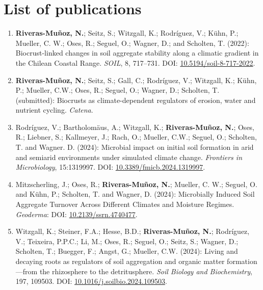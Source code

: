 \chapter*{List of publications}

\begin{enumerate}

\item \textbf{Riveras-Muñoz, N.}; Seitz, S.; Witzgall, K.; Rodríguez, V.; Kühn, P.; Mueller, C. W.; Oses, R.; Seguel, O.; Wagner, D.; and Scholten, T. (2022): Biocrust-linked changes in soil aggregate stability along a climatic gradient in the Chilean Coastal Range. \textit{SOIL}, 8, 717--731. DOI: \href{https://doi.org/10.5194/soil-8-717-2022}{10.5194/soil-8-717-2022}.

\item \textbf{Riveras-Muñoz, N.}; Seitz, S.; Gall, C.; Rodríguez, V.; Witzgall, K.; Kühn, P.; Mueller, C.W.; Oses, R.; Seguel, O.; Wagner, D.; Scholten, T. (submitted): Biocrusts as climate-dependent regulators of erosion, water and nutrient cycling. \textit{Catena}.

\item Rodríguez, V.; Bartholomäus, A.; Witzgall, K.; \textbf{Riveras-Muñoz, N.}; Oses, R.; Liebner, S.; Kallmeyer, J.; Rach, O.; Mueller, C.W.; Seguel, O.; Scholten, T. and Wagner. D. (2024): Microbial impact on initial soil formation in arid and semiarid environments under simulated climate change. \textit{Frontiers in Microbiology}, 15:1319997. DOI: \href{https://doi.org/10.3389/fmicb.2024.1319997}{10.3389/fmicb.2024.1319997}.

\item Mitzscherling, J.; Oses, R.; \textbf{Riveras-Muñoz, N.}; Mueller, C. W.; Seguel, O. and Kühn, P.; Scholten, T. and Wagner, D. (2024): Microbially Induced Soil Aggregate Turnover Across Different Climates and Moisture Regimes.  \textit{Geoderma}: DOI: \href{https://doi.org/10.2139/ssrn.4740477}{10.2139/ssrn.4740477}.

\item Witzgall, K.; Steiner, F.A.; Hesse, B.D.; \textbf{Riveras-Muñoz, N.}; Rodríguez, V.; Teixeira, P.P.C.; Li, M.; Oses, R.; Seguel, O.; Seitz, S.; Wagner, D.; Scholten, T.; Buegger, F.; Angst, G.; Mueller, C.W. (2024): Living and decaying roots as regulators of soil aggregation and organic matter formation---from the rhizosphere to the detritusphere. \textit{Soil Biology and Biochemistry}, 197, 109503. DOI: \href{https://doi.org/10.1016/j.soilbio.2024.109503}{10.1016/j.soilbio.2024.109503}.

\end{enumerate}
